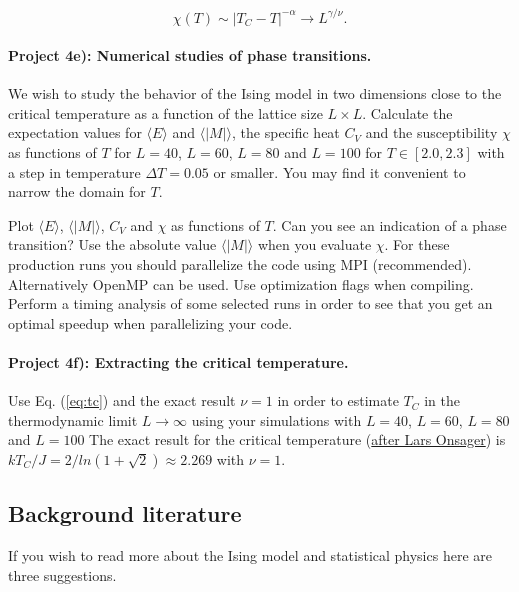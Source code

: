 \documentclass[%
oneside,                 %
final,                   %
10pt]{article}
\begin{document}
\begin{equation}
  \chi(T) \sim \left|T_C-T\right|^{-\alpha} \rightarrow L^{\gamma/\nu}.
  \label{eq:scale3}
\end{equation}


\paragraph{Project 4e): Numerical studies of phase transitions.}
We wish to study the behavior of the Ising model
in two dimensions close to the critical temperature as a function of
the lattice size $L\times L$. Calculate the expectation values for
$\langle E\rangle$ and $\langle \vert M\vert \rangle$, the specific heat
$C_V$ and the susceptibility $\chi$ as functions of $T$ for $L=40$,
$L=60$, $L=80$ and $L=100$ for $T\in [2.0,2.3]$ with a step in
temperature $\Delta T=0.05$ or smaller.  You may find it convenient to narrow the domain for $T$. 

Plot $\langle E\rangle$,
$\langle \vert M\vert\rangle$, $C_V$ and $\chi$ as functions of $T$. Can
you see an indication of a phase transition?  Use the absolute value
$\langle \vert M\vert\rangle$ when you evaluate $\chi$.  For these production runs you should
parallelize the code using MPI (recommended). Alternatively OpenMP can be used. Use optimization flags when compiling. Perform a timing analysis of some selected runs in order to see that you get an optimal speedup when parallelizing your code. 



\paragraph{Project 4f): Extracting the critical temperature.}
Use Eq. (\ref{eq:tc}) and the exact result
$\nu=1$ in order to estimate $T_C$ in the thermodynamic limit 
$L\rightarrow \infty$
using your simulations with $L=40$, $L=60$, $L=80$ and $L=100$
The exact result for the critical temperature (\href{{http://journals.aps.org/pr/abstract/10.1103/PhysRev.65.117}}{after Lars Onsager}) is
$kT_C/J=2/ln(1+\sqrt{2})\approx 2.269$ with $\nu=1$.

\subsection*{Background literature}

If you wish to read more about the Ising model and statistical physics here are three suggestions.
\end{document}
